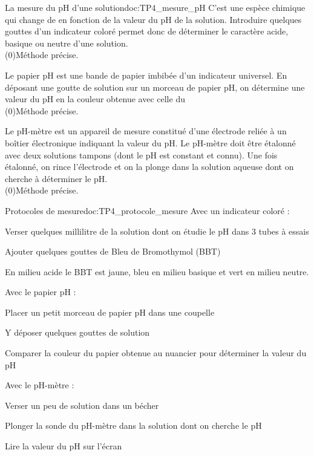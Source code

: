 \begin{doc}{La mesure du pH d'une solution}{doc:TP4_mesure_pH}
  \pointCyan {}
  C’est une espèce chimique qui change de  en fonction de la valeur du pH de la solution.
  Introduire quelques gouttes d’un indicateur coloré permet donc de déterminer le caractère acide, basique ou neutre d’une solution. \\
  \flecheLongue \texteTrou(0){Méthode  précise.}

  \pointCyan {}
  Le papier pH est une bande de papier imbibée d’un indicateur universel.
  En déposant une goutte de solution sur un morceau de papier pH, on détermine une valeur  du pH en  la couleur obtenue avec celle du  \\  
  \flecheLongue \texteTrou(0){Méthode  précise.}

  \pointCyan {}
  Le pH-mètre est un appareil de mesure constitué d’une électrode reliée à un boîtier électronique indiquant la valeur du pH.
  Le pH-mètre doit être étalonné avec deux solutions tampons (dont le pH est constant et connu).
  Une fois étalonné, on rince l’électrode et on la plonge dans la solution aqueuse dont on cherche à déterminer le pH. \\
  \flecheLongue \texteTrou(0){Méthode  précise.}
\end{doc}

\begin{doc}{Protocoles de mesure}{doc:TP4_protocole_mesure}
  Avec un indicateur coloré :
  \begin{protocole}
    \item Verser quelques millilitre de la solution dont on étudie le pH dans 3 tubes à essais
    \item Ajouter quelques gouttes de Bleu de Bromothymol (BBT)
    \item En milieu acide le BBT est jaune, bleu en milieu basique et vert en milieu neutre.
  \end{protocole}
  
  Avec le papier pH :
  \begin{protocole}
    \item Placer un petit morceau de papier pH dans une coupelle
    \item Y déposer quelques gouttes de solution
    \item Comparer la couleur du papier obtenue au nuancier pour déterminer la valeur du pH
  \end{protocole}
  
  Avec le pH-mètre :
  \begin{protocole}
    \item Verser un peu de solution dans un bécher
    \item Plonger la sonde du pH-mètre dans la solution dont on cherche le pH
    \item Lire la valeur du pH sur l’écran
  \end{protocole}
\end{doc}

